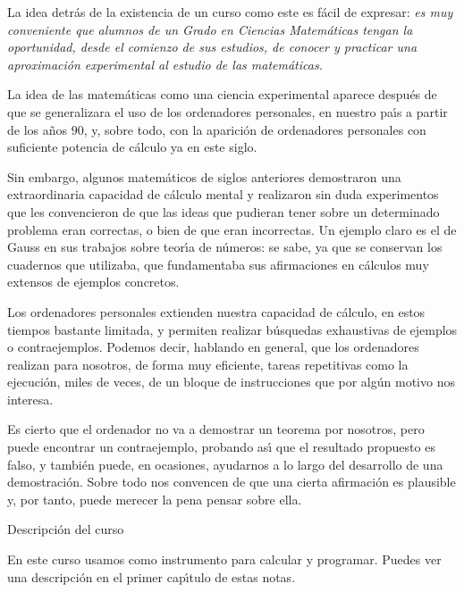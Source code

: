 \label{prologo}
La idea detr\'as de la existencia de un curso como este es f\'acil de expresar:
{\itshape es muy conveniente que alumnos de un Grado en Ciencias Matem\'aticas
tengan la oportunidad, desde
el comienzo de sus estudios, de conocer y practicar una aproximaci\'on
experimental al estudio de las matem\'aticas.}

\smallskip

La idea de las matem\'aticas como una ciencia experimental aparece despu\'es de
que se generalizara el uso de los ordenadores personales, en nuestro pa\'{\i}s a
partir de los a\~nos $90$, y, sobre todo,  con la aparici\'on de ordenadores
personales con suficiente potencia de c\'alculo ya en este siglo. 

\smallskip

Sin embargo, algunos matem\'aticos de siglos anteriores demostraron una
extraordinaria capacidad de c\'alculo mental y realizaron sin duda experimentos
que les convencieron de que las ideas que pudieran tener sobre un determinado
problema eran correctas, o bien de que eran  incorrectas. Un ejemplo claro es el
de Gauss en sus trabajos sobre teor\'{\i}a de n\'umeros: se sabe, ya que se
conservan los cuadernos que utilizaba, que fundamentaba sus afirmaciones en
c\'alculos muy extensos de ejemplos concretos.

\smallskip

Los ordenadores personales extienden nuestra capacidad de c\'alculo, en estos
tiempos bastante limitada, y permiten realizar b\'usquedas exhaustivas de
ejemplos o contraejemplos. Podemos decir, hablando en general, que los
ordenadores realizan para nosotros, de forma muy eficiente,  tareas repetitivas
como la ejecuci\'on, miles de veces,  de un bloque de instrucciones que por
alg\'un motivo nos interesa.  

\smallskip

Es cierto que el ordenador no va a demostrar un teorema por nosotros, pero puede
encontrar un contraejemplo, probando as\'{\i} que el resultado propuesto es
falso, y tambi\'en puede, en ocasiones, ayudarnos a lo largo del desarrollo de
una demostraci\'on. Sobre todo nos convencen de que una cierta afirmaci\'on es
plausible y, por tanto, puede merecer la pena pensar sobre ella.


\bigskip


\pagebreak[3]

{\sc Descripci\'on del curso}

En este curso usamos {\sage} como instrumento para calcular y programar. Puedes
ver
una descripci\'on en el primer cap\'{\i}tulo de estas notas. 


